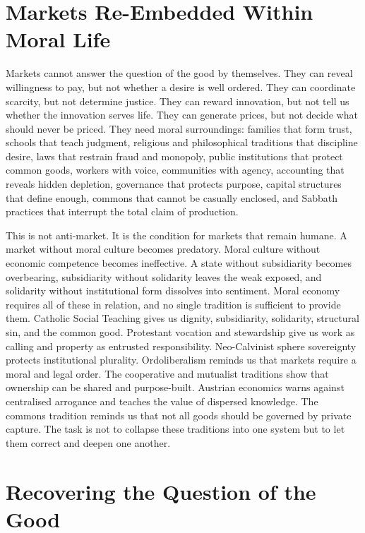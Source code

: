 \documentclass[11pt,a4paper,oneside]{book}
\begin{document}
\section*{Markets Re-Embedded Within Moral Life}

Markets cannot answer the question of the good by themselves. They can reveal willingness to pay, but not whether a desire is well ordered. They can coordinate scarcity, but not determine justice. They can reward innovation, but not tell us whether the innovation serves life. They can generate prices, but not decide what should never be priced. They need moral surroundings: families that form trust, schools that teach judgment, religious and philosophical traditions that discipline desire, laws that restrain fraud and monopoly, public institutions that protect common goods, workers with voice, communities with agency, accounting that reveals hidden depletion, governance that protects purpose, capital structures that define enough, commons that cannot be casually enclosed, and Sabbath practices that interrupt the total claim of production.

This is not anti-market. It is the condition for markets that remain humane. A market without moral culture becomes predatory. Moral culture without economic competence becomes ineffective. A state without subsidiarity becomes overbearing, subsidiarity without solidarity leaves the weak exposed, and solidarity without institutional form dissolves into sentiment. Moral economy requires all of these in relation, and no single tradition is sufficient to provide them. Catholic Social Teaching gives us dignity, subsidiarity, solidarity, structural sin, and the common good. Protestant vocation and stewardship give us work as calling and property as entrusted responsibility. Neo-Calvinist sphere sovereignty protects institutional plurality. Ordoliberalism reminds us that markets require a moral and legal order. The cooperative and mutualist traditions show that ownership can be shared and purpose-built. Austrian economics warns against centralised arrogance and teaches the value of dispersed knowledge. The commons tradition reminds us that not all goods should be governed by private capture. The task is not to collapse these traditions into one system but to let them correct and deepen one another.

\section*{Recovering the Question of the Good}
\end{document}
